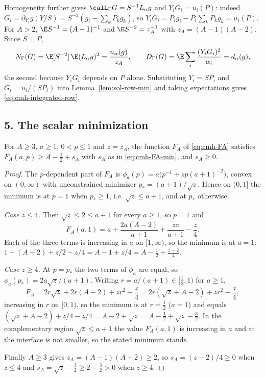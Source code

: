 \documentclass[../main.tex]{subfiles}
\begin{document}
Homogeneity further gives $\calL_\Gamma G=S^{-1}L_\alpha g$ and $Y_iG_i=u_i(P)$: indeed
$G_i=\partial_{Y_i}g(Y/S)=S^{-1}(g_i-\sum_kP_kg_k)$, so $Y_iG_i=P_ig_i-P_i\sum_kP_kg_k=u_i(P)$.
For $A>2$, $\E S^{-1}=(A-1)^{-1}$ and $\E S^{-2}=z_A^{-1}$ with $z_A=(A-1)(A-2)$. Since
$S\perp P$,
\[
  N_\Gamma(G)=\E[S^{-2}]\,\E(L_\alpha g)^2=\frac{n_\alpha(g)}{z_A},
  \qquad
  D_\Gamma(G)=\E\sum_i\frac{(Y_iG_i)^2}{\alpha_i}=d_\alpha(g),
\]
the second because $Y_iG_i$ depends on $P$ alone. Substituting $Y_i=SP_i$ and $G_i=u_i/(SP_i)$
into Lemma~\ref{lem:sol-row-min} and taking expectations gives \eqref{eq:cmh-integrated-row}.

\subsection*{5. The scalar minimization}

\begin{lemma}[= Lemma~\ref{lem:cmh-angular-coefficient}]
\label{lem:sol-angular}
For $A\ge3$, $a\ge1$, $0<p\le1$ and $z=z_A$, the function $F_A$ of \eqref{eq:cmh-FA} satisfies
$F_A(a,p)\ge A-\tfrac12+s_A$ with $s_A$ as in \eqref{eq:cmh-FA-min}, and $s_A\ge0$.
\end{lemma}

\begin{proof}
The $p$-dependent part of $F_A$ is $\phi_a(p)=a\bigl(p^{-1}+zp(a+1)^{-2}\bigr)$, convex on
$(0,\infty)$ with unconstrained minimizer $p_*=(a+1)/\sqrt z$. Hence on $(0,1]$ the minimum is
at $p=1$ when $p_*\ge1$, i.e. $\sqrt z\le a+1$, and at $p_*$ otherwise.

\emph{Case $z\le4$.} Then $\sqrt z\le2\le a+1$ for every $a\ge1$, so $p=1$ and
\[
  F_A(a,1)=a+\frac{2a(A-2)}{a+1}+\frac{za}{a+1}-\frac z4 .
\]
Each of the three terms is increasing in $a$ on $[1,\infty)$, so the minimum is at $a=1$:
$1+(A-2)+z/2-z/4=A-1+z/4=A-\tfrac12+\tfrac{z-2}4$.

\emph{Case $z\ge4$.} At $p=p_*$ the two terms of $\phi_a$ are equal, so
$\phi_a(p_*)=2a\sqrt z/(a+1)$. Writing $r=a/(a+1)\in[\tfrac12,1)$ for $a\ge1$,
\[
  F_A=2r\sqrt z+2r(A-2)+zr^2-\frac z4=2r(\sqrt z+A-2)+zr^2-\frac z4,
\]
increasing in $r$ on $[0,1)$, so the minimum is at $r=\tfrac12$ ($a=1$) and equals
$(\sqrt z+A-2)+z/4-z/4=A-2+\sqrt z=A-\tfrac12+\sqrt z-\tfrac32$. In the complementary region
$\sqrt z\le a+1$ the value $F_A(a,1)$ is increasing in $a$ and at the interface is not smaller,
so the stated minimum stands.

Finally $A\ge3$ gives $z_A=(A-1)(A-2)\ge2$, so $s_A=(z-2)/4\ge0$ when $z\le4$ and
$s_A=\sqrt z-\tfrac32\ge2-\tfrac32>0$ when $z\ge4$.
\end{proof}
\end{document}
